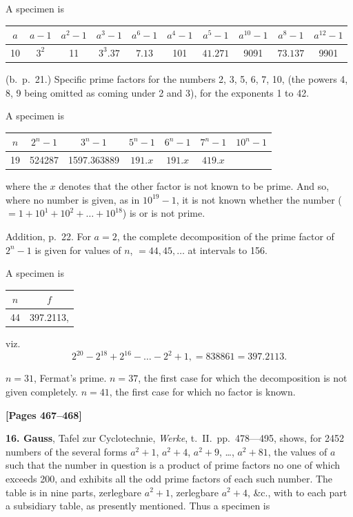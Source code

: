 \documentclass[11pt,a4paper]{article}
\begin{document}
A specimen is
\begin{center}
\begin{tabular}{c|c|c|c|c|c|c|c|c|c}
$a$ & $a-1$ & $a^{2}-1$ & $a^{3}-1$ & $a^{6}-1$ & $a^{4}-1$ & $a^{5}-1$ & $a^{10}-1$ & $a^{8}-1$ & $a^{12}-1$ \\
\hline
10 & $3^{2}$ & 11 & $3^{3}.37$ & $7.13$ & 101 & $41.271$ & 9091 & $73.137$ & 9901 \\
\end{tabular}
\end{center}

(b.\ p.\ 21.) Specific prime factors for the numbers 2, 3, 5, 6, 7, 10, (the powers 4, 8, 9 being omitted as coming under 2 and 3), for the exponents 1 to 42.

A specimen is
\begin{center}
\begin{tabular}{c|c|c|c|c|c|c}
$n$ & $2^{n}-1$ & $3^{n}-1$ & $5^{n}-1$ & $6^{n}-1$ & $7^{n}-1$ & $10^{n}-1$ \\
\hline
19 & 524287 & 1597.363889 & $191.x$ & $191.x$ & $419.x$ & \\
\end{tabular}
\end{center}
where the $x$ denotes that the other factor is not known to be prime. And so, where no number is given, as in $10^{19}-1$, it is not known whether the number ($=1+10^{1}+10^{2}+\ldots+10^{18}$) is or is not prime.

Addition, p.\ 22. For $a=2$, the complete decomposition of the prime factor of $2^{n}-1$ is given for values of $n$, $=44, 45, \ldots$ at intervals to 156.

A specimen is
\begin{center}
\begin{tabular}{c|c}
$n$ & $f$ \\
\hline
44 & 397.2113,
\end{tabular}
\end{center}
viz.
\[2^{20}-2^{18}+2^{16}-\ldots-2^{2}+1, = 838861 = 397.2113.\]

$n=31$, Fermat's prime. $n=37$, the first case for which the decomposition is not given completely. $n=41$, the first case for which no factor is known.

\newpage
\textbf{[Pages 467--468]}

\textbf{16. Gauss}, Tafel zur Cyclotechnie, \textit{Werke}, t.\ II.\ pp.\ 478---495, shows, for 2452 numbers of the several forms $a^{2}+1$, $a^{2}+4$, $a^{2}+9$, \ldots, $a^{2}+81$, the values of $a$ such that the number in question is a product of prime factors no one of which exceeds 200, and exhibits all the odd prime factors of each such number. The table is in nine parts, zerlegbare $a^{2}+1$, zerlegbare $a^{2}+4$, \&c., with to each part a subsidiary table, as presently mentioned. Thus a specimen is
\end{document}
